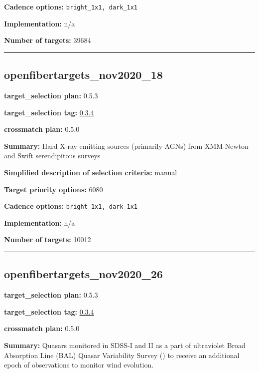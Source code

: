 \noindent\textbf{Cadence options:} \texttt{bright\_1x1,\ dark\_1x1}

\noindent\textbf{Implementation:} n/a

\noindent\textbf{Number of targets:} 39684

\begin{center}\rule{0.5\linewidth}{0.5pt}\end{center}

\hypertarget{openfibertargets_nov2020_18_plan0.5.3}{%
\subsection{openfibertargets\_nov2020\_18}\label{openfibertargets_nov2020_18_plan0.5.3}}

\noindent\textbf{target\_selection plan:} 0.5.3

\noindent\textbf{target\_selection tag:}
\href{https://github.com/sdss/target_selection/tree/0.3.4/}{0.3.4}

\noindent\textbf{crossmatch plan:} 0.5.0

\noindent\textbf{Summary:} Hard X-ray emitting sources (primarily AGNs) from
XMM-Newton and Swift serendipitous surveys

\noindent\textbf{Simplified description of selection criteria:} manual


\noindent\textbf{Target priority options:} 6080

\noindent\textbf{Cadence options:} \texttt{bright\_1x1,\ dark\_1x1}

\noindent\textbf{Implementation:} n/a

\noindent\textbf{Number of targets:} 10012

\begin{center}\rule{0.5\linewidth}{0.5pt}\end{center}

\hypertarget{openfibertargets_nov2020_26_plan0.5.3}{%
\subsection{openfibertargets\_nov2020\_26}\label{openfibertargets_nov2020_26_plan0.5.3}}

\noindent\textbf{target\_selection plan:} 0.5.3

\noindent\textbf{target\_selection tag:}
\href{https://github.com/sdss/target_selection/tree/0.3.4/}{0.3.4}

\noindent\textbf{crossmatch plan:} 0.5.0

\noindent\textbf{Summary:} Quasars monitored in SDSS-I and II as a part of
ultraviolet Broad Absorption Line (BAL) Quasar Variability Survey
(\citealt{Gibson2009}) to receive an additional epoch of observations to monitor
wind evolution.

